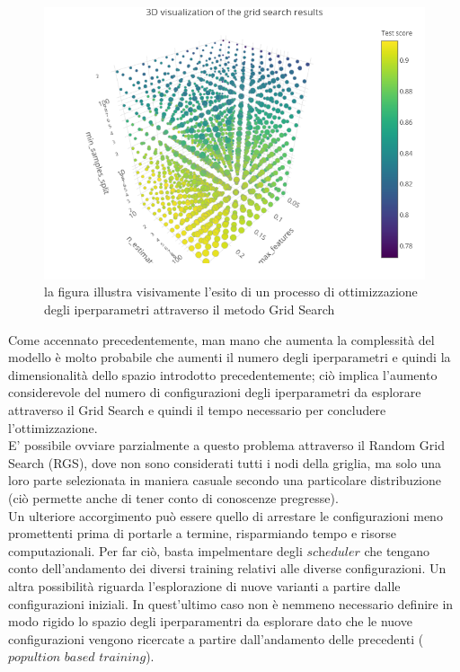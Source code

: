 \begin{figure}[h!]
	\includegraphics[width=\linewidth]{figs/Grid_immagine.png}
	\caption{la figura illustra visivamente l'esito di un processo di ottimizzazione degli iperparametri attraverso il metodo Grid Search \cite{knuthwebsite}}
	\label{fig:Grid Search}
\end{figure}
\newpage 

Come accennato precedentemente, man mano che aumenta la complessità del modello è molto probabile che aumenti il numero degli iperparametri e quindi la dimensionalità dello spazio introdotto precedentemente; ciò implica l'aumento considerevole del numero di configurazioni degli iperparametri da esplorare attraverso il Grid Search e quindi il tempo necessario per concludere l'ottimizzazione.\\
E' possibile ovviare parzialmente a questo problema attraverso il Random Grid Search (RGS), dove non sono considerati tutti i nodi della griglia, ma solo una loro parte selezionata in maniera casuale secondo una particolare distribuzione (ciò permette anche di tener conto di conoscenze pregresse). \\
Un ulteriore accorgimento può  essere quello di arrestare le configurazioni meno promettenti prima di portarle a termine, risparmiando tempo e risorse computazionali. Per far ciò, basta impelmentare degli $\textit{scheduler}$ che tengano conto dell'andamento dei diversi training relativi alle diverse configurazioni. Un altra possibilità riguarda l'esplorazione di nuove varianti a partire dalle configurazioni iniziali. In quest'ultimo caso non è nemmeno necessario definire in modo rigido lo spazio degli iperparamentri da esplorare dato che le nuove configurazioni vengono ricercate a partire dall'andamento delle precedenti ($\textit{popultion based training}$).

